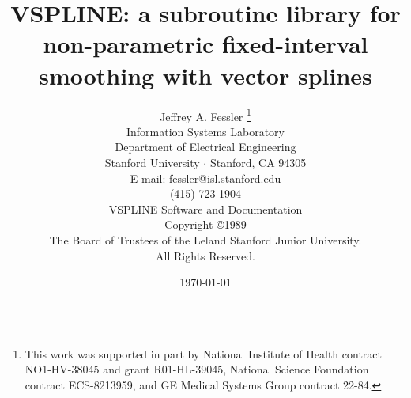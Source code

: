 
\title{VSPLINE: a subroutine library for non-parametric fixed-interval smoothing with vector splines}

\author{Jeffrey A. Fessler%
\thanks{
	This work was supported in part by
	National Institute of Health 
		contract NO1-HV-38045
		and
		grant R01-HL-39045,
	National Science Foundation contract ECS-8213959,
	and
	GE Medical Systems Group contract 22-84.
}\\
     Information Systems Laboratory \\
     Department of Electrical Engineering \\
     Stanford University $\cdot$ Stanford, CA 94305 \\
     E-mail: fessler@isl.stanford.edu \\
     (415) 723-1904 %
\vspace*{0.5in} \\
VSPLINE Software and Documentation \\
Copyright \copyright 1989 \\
The Board of Trustees of the Leland Stanford Junior University.\\
All Rights Reserved.
     }

\date{\today}

\maketitle

